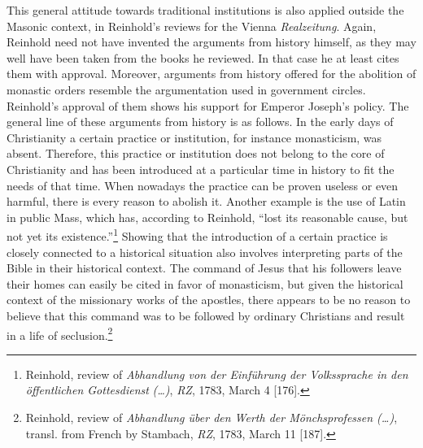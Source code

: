This general attitude towards traditional institutions is also applied outside the Masonic context, in Reinhold's reviews for the Vienna \textit{Realzeitung}. Again, Reinhold need not have invented the arguments from history himself, as they may well have been taken from the books he reviewed. In that case he at least cites them with approval. Moreover, arguments from history offered for the abolition of monastic orders resemble the argumentation used in government circles. Reinhold's approval of them shows his support for Emperor Joseph's policy. The general line of these arguments from history is as follows. In the early days of Christianity a certain practice or institution, for instance monasticism, was absent. Therefore, this practice or institution does not belong to the core of Christianity and has been introduced at a particular time in history to fit the needs of that time. When nowadays the practice can be proven useless or even harmful, there is every reason to abolish it. Another example is the use of Latin in public Mass, which has, according to Reinhold, ``lost its reasonable cause, but not yet its existence.''\footnote{ Reinhold, review of \textit{Abhandlung von der Einf\"{u}hrung der Volkssprache in den \"{o}ffentlichen Gottesdienst} \textit{(\ldots )}, \textit{RZ}, 1783, March 4 [176]. } Showing that the introduction of a certain practice is closely connected to a historical situation also involves interpreting parts of the Bible in their historical context. The command of Jesus that his followers leave their homes can easily be cited in favor of monasticism, but given the historical context of the missionary works of the apostles, there appears to be no reason to believe that this command was to be followed by ordinary Christians and result in a life of seclusion.\footnote{ Reinhold, review of \textit{Abhandlung \"{u}ber den Werth der M\"{o}nchsprofessen (\ldots )}, transl. from French by Stambach, \textit{RZ}, 1783, March 11 [187]. } 

